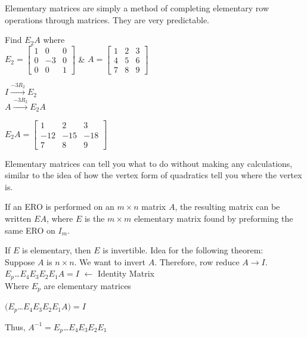 \documentclass{report}
\begin{document}
Elementary matrices are simply a method of completing elementary row operations through matrices. They are very predictable.

\begin{example}
Find $E_2A$ where\\
$E_2=
\begin{bmatrix}
1 & 0 & 0 \\
0 & -3 & 0 \\
0 & 0 & 1
\end{bmatrix}$ \&
$A=
\begin{bmatrix}
1 & 2 & 3 \\
4 & 5 & 6 \\
7 & 8 & 9
\end{bmatrix}$\vspace{2mm}

\begin{center}
	$I\xrightarrow{-3R_2} E_2$\\
	$A\xrightarrow{-3R_2} E_2A$\\\vspace{2mm}
\end{center}
$E_2A=\begin{bmatrix}
1 & 2 & 3 \\
-12 & -15 & -18 \\
7 & 8 & 9 
\end{bmatrix}$
\end{example}

Elementary matrices can tell you what to do without making any calculations, similar to the idea of how the vertex form of quadratics tell you where the vertex is.

\begin{proposition}
If an ERO is performed on an $m\times n$ matrix $A$, the resulting matrix can be written $EA$, where $E$ is the $m\times m$ elementary matrix found by preforming the same ERO on $I_m$.
\end{proposition}

\begin{proposition}
If $E$ is elementary, then $E$ is invertible. Idea for the following theorem:\\
Suppose $A$ is $n\times n$. We want to invert $A$. Therefore, row reduce $A \rightarrow I$.\\
$E_p$\dots $E_4E_3E_2E_1A = I$ $\leftarrow$ Identity Matrix\\
Where $E_p$ are elementary matrices\\
\begin{center}
$(E_p$\dots $E_4E_3E_2E_1A) = I$
\end{center}
Thus, $A^{-1}=E_p$\dots $E_4E_3E_2E_1$
\end{proposition}
\end{document}
